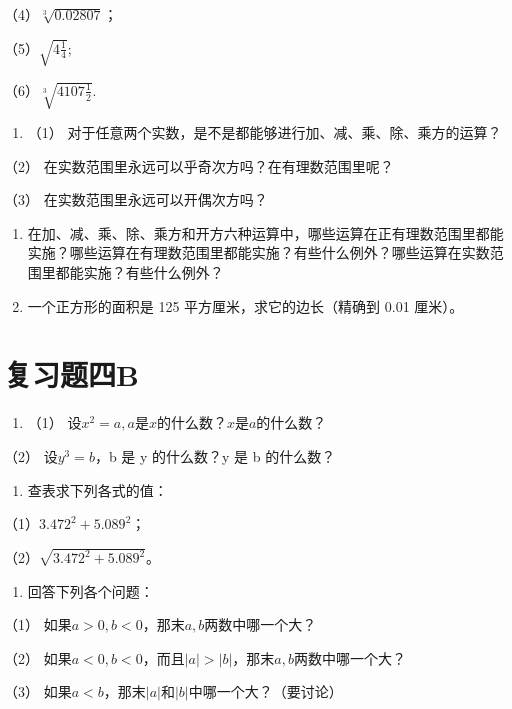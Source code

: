 （4）\(\sqrt[3]{0.02807}\)；

（5）\(\sqrt{4\frac{1}{4}};\)

（6）\(\sqrt[3]{4107\frac{1}{2}}.\)

\begin{enumerate}[start=5]
\item
  （1） 对于任意两个实数，是不是都能够进行加、减、乘、除、乘方的运算？
\end{enumerate}

（2） 在实数范围里永远可以乎奇次方吗？在有理数范围里呢？

（3） 在实数范围里永远可以开偶次方吗？

\begin{enumerate}[start=6]
\item
  在加、减、乘、除、乘方和开方六种运算中，哪些运算在正有理数范围里都能实施？哪些运算在有理数范围里都能实施？有些什么例外？哪些运算在实数范围里都能实施？有些什么例外？
\item
  一个正方形的面积是 125 平方厘米，求它的边长（精确到 0.01 厘米）。
\end{enumerate}

\section{复习题四B}

\begin{enumerate}
\item
  （1） 设\(x^{2} = a, a\)是\(x\)的什么数？\(x\)是\(a\)的什么数？
\end{enumerate}

（2） 设\(y^{3}=b\)，b 是 y 的什么数？y 是 b 的什么数？

\begin{enumerate}[start=2]
\item
  查表求下列各式的值：
\end{enumerate}

（1）\(3.472^{2} + 5.089^{2}\)；

（2）\(\sqrt{3.472^2 + 5.089^2}\)。

\begin{enumerate}[start=3]
\item
  回答下列各个问题：
\end{enumerate}

（1） 如果\(a > 0, b < 0\)，那末\(a, b\)两数中哪一个大？

（2）
如果\(a < 0, b < 0\)，而且\(|a| > |b|\)，那末\(a, b\)两数中哪一个大？

（3） 如果\(a < b\)，那末\(|a|\)和\(|b|\)中哪一个大？（要讨论）

